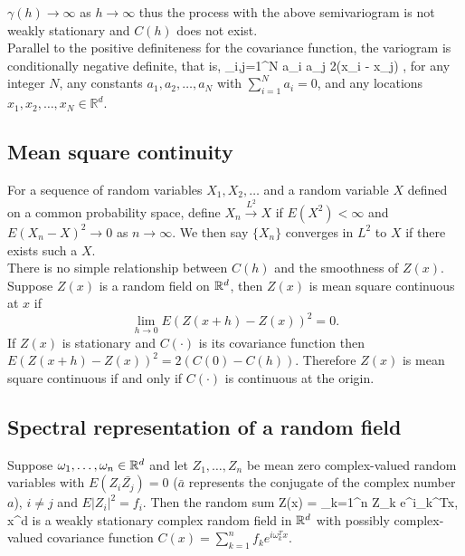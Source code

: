
\noindent $\gamma(h) \to \infty$ as $h \to \infty$ thus the process with the above semivariogram is not weakly stationary and $C(h)$ does not exist. \\

Parallel to the positive definiteness for the covariance function, the variogram is conditionally negative definite, that is,
\beq
\sum_{i,j=1}^{N} a_i a_j 2\gamma(x_i - x_j) ,
\eeq
for any integer $N$, any constants $a_1, a_2, \ldots, a_N$ with $\sum_{i=1}^N a_i = 0$, and any locations $x_1, x_2, \ldots, x_N \in \mathbb{R}^d$.


\subsection{\bf Mean square continuity}

For a sequence of random variables $X_1, X_2,\ldots$ and a random variable $X$ defined on a common probability space, define $X_n\overset{L^2}\to X$ if $E(X^2)<\infty$ and $E(X_n - X)^2\to 0$ as $n \rightarrow \infty$. We then say $\{X_n\}$ converges in $L^2$ to $X$ if there exists such a $X$.\\

There is no simple relationship between $C(h)$ and the smoothness of $Z(x)$. Suppose $Z(x)$ is a random field on $\mathbb{R}^d$, then $Z(x)$ is mean square continuous at $x$ if
\[
\lim_{h\to 0} E(Z(x+h)-Z(x))^2 =0.
\]
If $Z(x)$ is stationary and $C(\cdot)$ is its covariance function then $E(Z(x+h)-Z(x))^2=2(C(0)-C(h))$. Therefore $Z(x)$ is mean square continuous if and only if $C(\cdot)$ is continuous at the origin.\\

\subsection{\bf Spectral representation of a random field}

Suppose $\omega_1,\ldots, \omega_n \in \mathbb{R}^d$ and let $Z_1, \ldots, Z_n$ be mean zero complex-valued random variables with  $E(Z_i\bar{Z_j})=0$  ($\bar{a}$ represents the conjugate of the complex number $a$), $i\ne j$ and  $E|Z_i|^2=f_i$. Then the random sum
\beq
Z(x) = \sum_{k=1}^n Z_k e^{i\omega_k^Tx}, \quad x\in\R^d
\eeq
is a weakly stationary complex random field in $\mathbb{R}^d$ with possibly complex-valued covariance function $C(x) = \sum_{k=1}^n f_k e^{i\omega_k^Tx}$. \\

